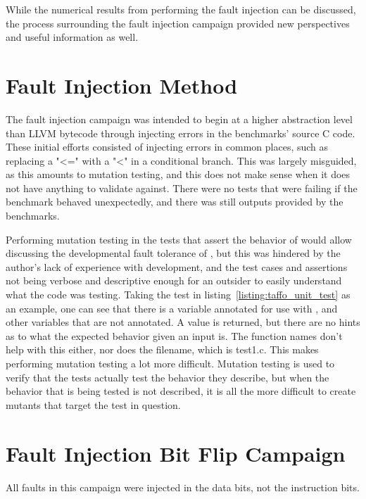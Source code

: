 
While the numerical results from performing the fault injection can be discussed, the process surrounding the fault injection campaign provided new perspectives and useful information as well. 

\section{Fault Injection Method}

The fault injection campaign was intended to begin at a higher abstraction level than LLVM bytecode through injecting errors in the benchmarks' source C code. These initial efforts consisted of injecting errors in common places, such as replacing a "<=" with a "<" in a conditional branch. This was largely misguided, as this amounts to mutation testing, and this does not make sense when it does not have anything to validate against. There were no tests that were failing if the benchmark behaved unexpectedly, and there was still outputs provided by the benchmarks. 

Performing mutation testing in the tests that assert the behavior of \taffo{} would allow discussing the developmental fault tolerance of \taffo{}, but this was hindered by the author's lack of experience with \taffo{} development, and the test cases and assertions not being verbose and descriptive enough for an outsider to easily understand what the code was testing. Taking the test in listing~\ref{listing:taffo_unit_test} as an example, one can see that there is a variable annotated for use with \taffo{},  and other variables that are not annotated. A value is returned, but there are no hints as to what the expected behavior given an input is. The function names don't help with this either, nor does the filename, which is test1.c. This makes performing mutation testing a lot more difficult. Mutation testing is used to verify that the tests actually test the behavior they describe, but when the behavior that is being tested is not described, it is all the more difficult to create mutants that target the test in question.

\section{Fault Injection Bit Flip Campaign}

All faults in this campaign were injected in the data bits, not the instruction bits.

